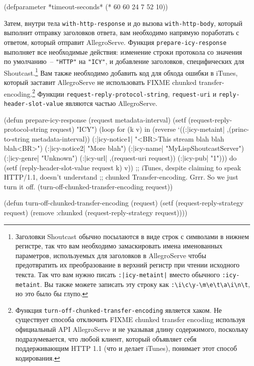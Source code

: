 \begin{myverb}
(defparameter *timeout-seconds* (* 60 60 24 7 52 10))
\end{myverb}

Затем, внутри тела \lstinline{with-http-response} и до вызова \lstinline{with-http-body}, который
выполнит отправку заголовков ответа, вам необходимо напрямую поработать с ответом, который
отправит AllegroServe.  Функция \lstinline{prepare-icy-response} выполняет все необходимые
действия: изменение строки протокола со значения по умолчанию~-- \lstinline{"HTTP"} на
\lstinline{"ICY"}, и добавление заголовков, специфических для Shoutcast.\footnote{Заголовки
  Shoutcast обычно посылаются в виде строк с символами в нижнем регистре, так что вам
  необходимо замаскировать имена именованных параметров, используемых для заголовков в
  AllegroServe чтобы предотвратить их преобразование в верхний регистр при чтении
  исходного текста.  Так что вам нужно писать \lstinline{:|icy-metaint|} вместо обычного
  \lstinline{:icy-metaint}.  Вы также можете записать эту строку как
  \lstinline!:\i\c\y-\m\e\t\a\i\n\t!, но это было бы глупо.}  Вам также необходимо
добавить код для обхода ошибки в iTunes, который заставит AllegroServe не использовать
FIXME chunked transfer-encoding.\footnote{Функция
  \lstinline{turn-off-chunked-transfer-encoding} является хаком.  Не существует способа
  отключить FIXME chunked transfer encoding используя официальный API AllegroServe и не
  указывая длину содержимого, поскольку подразумевается, что любой клиент, который
  объявляет себя поддерживающим HTTP 1.1 (что и делает iTunes), понимает этот способ
  кодирования.}  Функции \lstinline{request-reply-protocol-string}, \lstinline{request-uri} и
\lstinline{reply-header-slot-value} являются частью AllegroServe.

\begin{myverb}
(defun prepare-icy-response (request metadata-interval)
  (setf (request-reply-protocol-string request) "ICY")
  (loop for (k v) in (reverse
       `((:|icy-metaint| ,(princ-to-string metadata-interval))
         (:|icy-notice1| "<BR>This stream blah blah blah<BR>")
         (:|icy-notice2| "More blah")
         (:|icy-name|    "MyLispShoutcastServer")
         (:|icy-genre|   "Unknown")
         (:|icy-url|     ,(request-uri request))
         (:|icy-pub|     "1")))
     do (setf (reply-header-slot-value request k) v))
  ;; iTunes, despite claiming to speak HTTP/1.1, doesn't understand
  ;; chunked Transfer-encoding. Grrr. So we just turn it off.
  (turn-off-chunked-transfer-encoding request))

(defun turn-off-chunked-transfer-encoding (request)
  (setf (request-reply-strategy request)
        (remove :chunked (request-reply-strategy request))))
\end{myverb}

